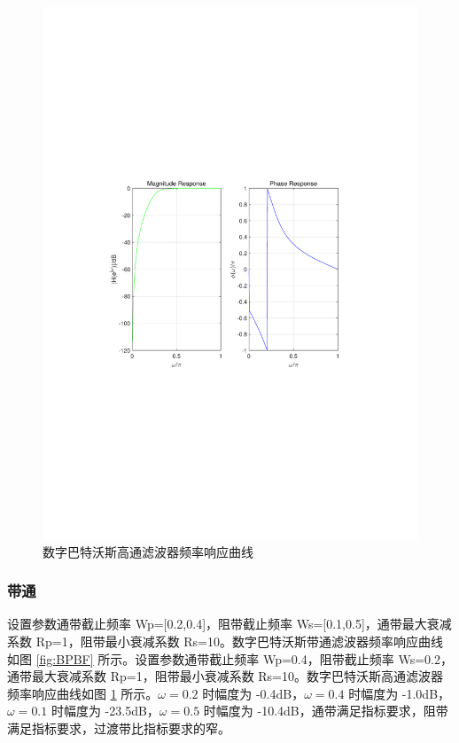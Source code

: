\documentclass[12pt,AutoFakeBold]{article}
\begin{document}
\begin{figure}[hbtp]
	\centering
	\includegraphics[width=14cm]{figure/HPBF.pdf}
	\caption{数字巴特沃斯高通滤波器频率响应曲线} \label{fig:HPBF}
\end{figure}


\subsubsection{带通}

设置参数通带截止频率 Wp=[0.2,0.4]，阻带截止频率 Ws=[0.1,0.5]，通带最大衰减系数 Rp=1，阻带最小衰减系数 Rs=10。数字巴特沃斯带通滤波器频率响应曲线如图 \ref{fig:BPBF} 所示。设置参数通带截止频率 Wp=0.4，阻带截止频率 Ws=0.2，通带最大衰减系数 Rp=1，阻带最小衰减系数 Rs=10。数字巴特沃斯高通滤波器频率响应曲线如图 \ref{fig:HPBF} 所示。$\omega=0.2$ 时幅度为 -0.4dB，$\omega=0.4$ 时幅度为 -1.0dB，$\omega=0.1$ 时幅度为 -23.5dB，$\omega=0.5$ 时幅度为 -10.4dB，通带满足指标要求，阻带满足指标要求，过渡带比指标要求的窄。
\end{document}

